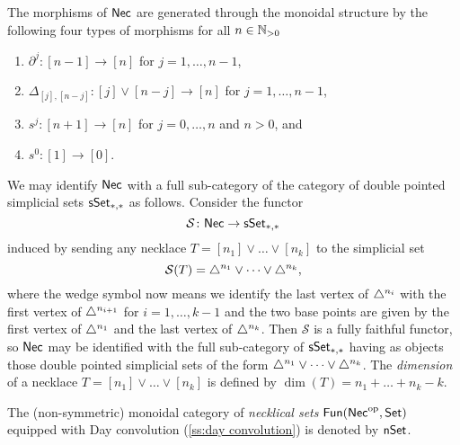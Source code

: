 The morphisms of $\mathsf{Nec}$ are generated through the monoidal structure by the following four types of morphisms for all $n \in\mathbb{N}_{>0} $
\begin{enumerate}
	\item $\partial^j \colon [n-1] \to [n]$ for $j = 1, \dots, n-1$,
	\item $\Delta_{[j], [n-j]} \colon [j] \vee [n-j] \to [n]$ for $j = 1, \dots, n-1$,
	\item $s^j \colon [n+1] \to [n]$ for $j = 0, \dots, n$ and $n>0$, and
	\item $s^0 \colon [1] \to [0]$.
\end{enumerate}
We may identify $\mathsf{Nec}$ with a full sub-category of the category of double pointed simplicial sets $\mathsf{sSet}_{*,*}$ as follows.
Consider the functor
\[
\mathcal{S} \colon \mathsf{Nec} \to \mathsf{sSet}_{*,*}
\]
induced by sending any necklace $T = [n_1] \vee \dots \vee[n_k]$ to the simplicial set
\[
\mathcal{S}(T) = \triangle^{n_1} \vee \dots \vee \triangle^{n_k},
\]
where the wedge symbol now means we identify the last vertex of $\triangle^{n_i}$ with the first vertex of $\triangle^{n_{i+1}}$ for $i = 1, \dots, k-1$ and the two base points are given by the first vertex of $\triangle^{n_1}$ and the last vertex of $\triangle^{n_k}$.
Then $\mathcal{S}$ is a fully faithful functor, so $\mathsf{Nec}$ may be identified with the full sub-category of $\mathsf{sSet}_{*,*}$ having as objects those double pointed simplicial sets of the form $\triangle^{n_1} \vee \dots \vee \triangle^{n_k}$.
The \textit{dimension} of a necklace $T = [n_1] \vee \dots \vee[n_k]$ is defined by $\dim(T) = n_1 + \dots + n_k-k$.

The (non-symmetric) monoidal category of \textit{necklical sets} $\mathsf{Fun}(\mathsf{Nec}^{\mathrm{op}}, \mathsf{Set})$ equipped with Day convolution (\cref{ss:day convolution}) is denoted by $\mathsf{nSet}$.

